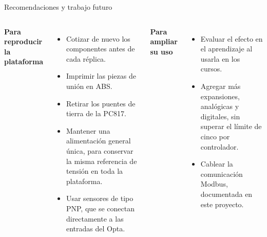 \documentclass[aspectratio=169,11pt]{beamer}
\begin{document}
\begin{frame}{Recomendaciones y trabajo futuro}
    \begin{columns}[T]
        \textbf{Para reproducir la plataforma}
        \begin{itemize}
            \item Cotizar de nuevo los componentes antes de cada réplica.
            \item Imprimir las piezas de unión en ABS.
            \item Retirar los puentes de tierra de la PC817.
            \item Mantener una alimentación general única, para conservar la misma referencia de tensión en toda la plataforma.
            \item Usar sensores de tipo PNP, que se conectan directamente a las entradas del Opta.
        \end{itemize}
        \textbf{Para ampliar su uso}
        \begin{itemize}
            \item Evaluar el efecto en el aprendizaje al usarla en los cursos.
            \item Agregar más expansiones, analógicas y digitales, sin superar el límite de cinco por controlador.
            \item Cablear la comunicación Modbus, documentada en este proyecto.
        \end{itemize}
    \end{columns}
\end{frame}
\end{document}
